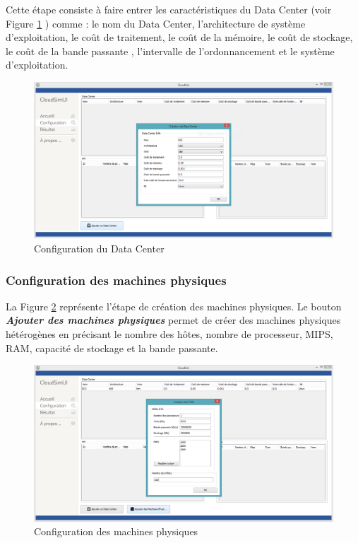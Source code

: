 \begin{onehalfspace}
Cette étape consiste à faire entrer les caractéristiques du Data Center (voir Figure \ref{ConfigurationdeDatacenter} ) comme : le nom du Data Center, l'architecture de système d'exploitation, le coût de traitement, le coût de la mémoire, le coût de stockage, le coût de la bande passante , l'intervalle de l'ordonnancement et le système d'exploitation. 

\begin{figure}[!h]
\begin{center}
\includegraphics[scale=0.4]{figures/inf2.png} 
\end{center}
\caption{Configuration du Data Center}
\label{ConfigurationdeDatacenter}
\end{figure}
\subsubsection{Configuration des machines physiques}
La Figure \ref{Configurationdesmachinesphysiques} représente l’étape de création des machines physiques. Le bouton \textit{\textbf{Ajouter des machines physiques}} permet de créer des machines physiques hétérogènes en précisant le nombre des hôtes, nombre de processeur, MIPS, RAM, capacité de stockage et la bande passante.
\clearpage
\begin{figure}[!h]
\begin{center}
\includegraphics[scale=0.4]{figures/inf3.png} 
\end{center}
\caption{Configuration des machines physiques}
\label{Configurationdesmachinesphysiques}
\end{figure}


\end{onehalfspace}
